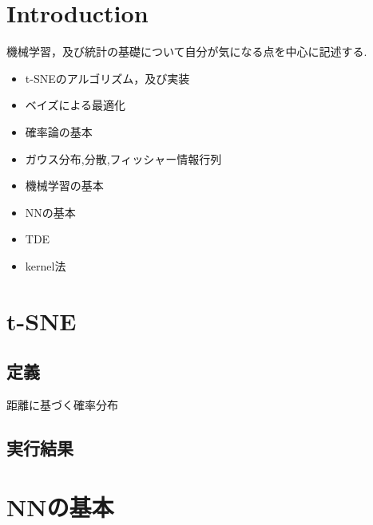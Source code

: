 \documentclass{ujarticle}
\begin{document}
\section{Introduction}
\label{sec:Introduction}
機械学習，及び統計の基礎について自分が気になる点を中心に記述する.

\begin{itemize}
  \item t-SNEのアルゴリズム，及び実装
  \item ベイズによる最適化
  \item 確率論の基本
  \item ガウス分布,分散,フィッシャー情報行列
  \item 機械学習の基本
  \item NNの基本
  \item TDE
  \item kernel法
\end{itemize}


\section{t-SNE}
\label{sec:t-SNE}
\subsection{定義}
\label{sub:定義}
距離に基づく確率分布

\subsection{実行結果}
\label{sub:実行結果}

\section{NNの基本}
\label{sec:NNの基本}
\end{document}
